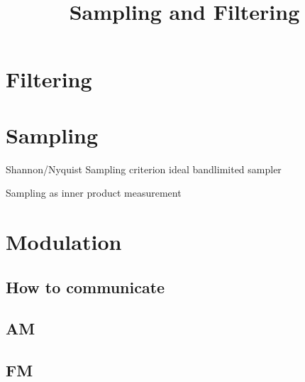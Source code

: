 \title{Sampling and Filtering}

\section{Filtering}


\section{Sampling} 
Shannon/Nyquist Sampling criterion
ideal bandlimited sampler

Sampling as inner product measurement


\section{Modulation}

\subsection{How to communicate}

\subsection{AM}

\subsection{FM}





